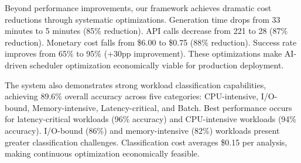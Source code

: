 Beyond performance improvements, our framework achieves dramatic cost reductions through systematic optimizations. Generation time drops from 33 minutes to 5 minutes (85\% reduction). API calls decrease from 221 to 28 (87\% reduction). Monetary cost falls from \$6.00 to \$0.75 (88\% reduction). Success rate improves from 65\% to 95\% (+30pp improvement). These optimizations make AI-driven scheduler optimization economically viable for production deployment.

The system also demonstrates strong workload classification capabilities, achieving 89.6\% overall accuracy across five categories: CPU-intensive, I/O-bound, Memory-intensive, Latency-critical, and Batch. Best performance occurs for latency-critical workloads (96\% accuracy) and CPU-intensive workloads (94\% accuracy). I/O-bound (86\%) and memory-intensive (82\%) workloads present greater classification challenges. Classification cost averages \$0.15 per analysis, making continuous optimization economically feasible.